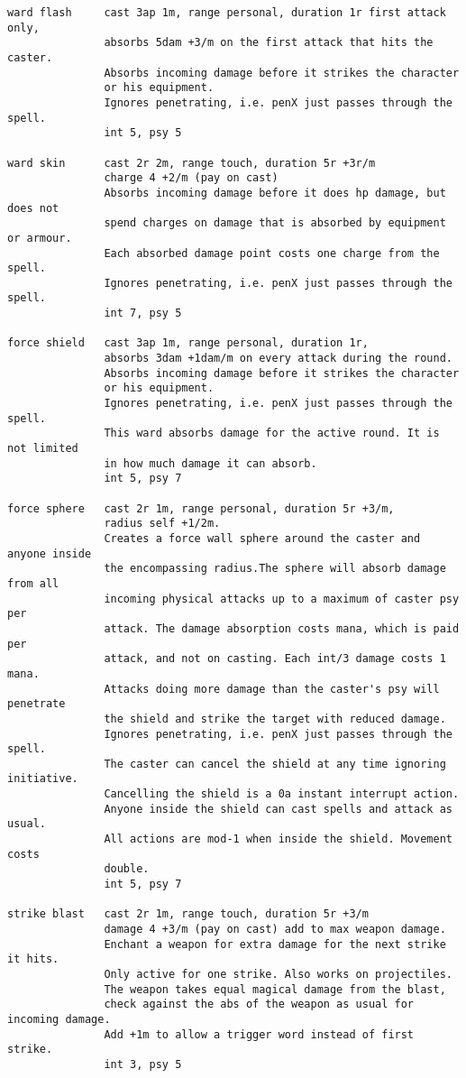\begin{verbatim}
ward flash     cast 3ap 1m, range personal, duration 1r first attack only,
               absorbs 5dam +3/m on the first attack that hits the caster.
               Absorbs incoming damage before it strikes the character
               or his equipment.
               Ignores penetrating, i.e. penX just passes through the spell.
               int 5, psy 5

ward skin      cast 2r 2m, range touch, duration 5r +3r/m
               charge 4 +2/m (pay on cast)
               Absorbs incoming damage before it does hp damage, but does not
               spend charges on damage that is absorbed by equipment or armour.
               Each absorbed damage point costs one charge from the spell.
               Ignores penetrating, i.e. penX just passes through the spell.
               int 7, psy 5

force shield   cast 3ap 1m, range personal, duration 1r,
               absorbs 3dam +1dam/m on every attack during the round.
               Absorbs incoming damage before it strikes the character
               or his equipment.
               Ignores penetrating, i.e. penX just passes through the spell.
               This ward absorbs damage for the active round. It is not limited
               in how much damage it can absorb.
               int 5, psy 7

force sphere   cast 2r 1m, range personal, duration 5r +3/m,
               radius self +1/2m.
               Creates a force wall sphere around the caster and anyone inside
               the encompassing radius.The sphere will absorb damage from all
               incoming physical attacks up to a maximum of caster psy per
               attack. The damage absorption costs mana, which is paid per
               attack, and not on casting. Each int/3 damage costs 1 mana.
               Attacks doing more damage than the caster's psy will penetrate
               the shield and strike the target with reduced damage.
               Ignores penetrating, i.e. penX just passes through the spell.
               The caster can cancel the shield at any time ignoring initiative.
               Cancelling the shield is a 0a instant interrupt action.
               Anyone inside the shield can cast spells and attack as usual.
               All actions are mod-1 when inside the shield. Movement costs
               double.
               int 5, psy 7

strike blast   cast 2r 1m, range touch, duration 5r +3/m
               damage 4 +3/m (pay on cast) add to max weapon damage.
               Enchant a weapon for extra damage for the next strike it hits.
               Only active for one strike. Also works on projectiles.
               The weapon takes equal magical damage from the blast,
               check against the abs of the weapon as usual for incoming damage.
               Add +1m to allow a trigger word instead of first strike.
               int 3, psy 5


\end{verbatim}
